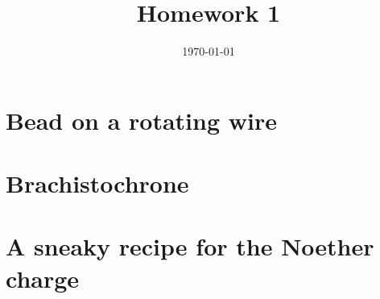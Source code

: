 \documentclass[12pt, a4paper]{article}
\title{Homework 1} %
\author{\PA} %
\date{\today} %
\begin{document}
\maketitlepage

\maketableofcontents

\section{Bead on a rotating wire}
\subsection{}
%
\subsection{}
\subsection{}
\subsection{}


\section{Brachistochrone}
%
\subsection{}
%
\subsection{}


\section{A sneaky recipe for the Noether charge}
%
\subsection{}
\subsection{}
\subsection{}
\subsection{}




\makereferences

\blankpage

\end{document}
